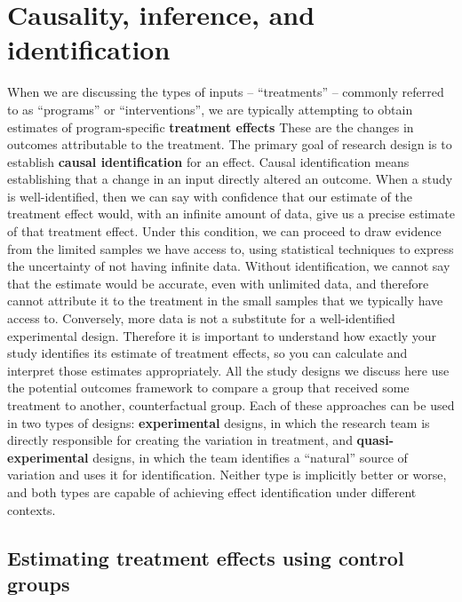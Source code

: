 \section{Causality, inference, and identification}

When we are discussing the types of inputs -- ``treatments'' -- commonly referred to as
``programs'' or ``interventions'', we are typically attempting to obtain estimates
of program-specific \textbf{treatment effects}
These are the changes in outcomes attributable to the treatment.\cite{abadie2018econometric}
The primary goal of research design is to establish \textbf{causal identification} for an effect.
Causal identification means establishing that a change in an input directly altered an outcome.
When a study is well-identified, then we can say with confidence
that our estimate of the treatment effect would,
with an infinite amount of data,
give us a precise estimate of that treatment effect.
Under this condition, we can proceed to draw evidence from the limited samples we have access to,
using statistical techniques to express the uncertainty of not having infinite data.
Without identification, we cannot say that the estimate would be accurate,
even with unlimited data, and therefore cannot attribute it to the treatment
in the small samples that we typically have access to.
Conversely, more data is not a substitute for a well-identified experimental design.
Therefore it is important to understand how exactly your study
identifies its estimate of treatment effects,
so you can calculate and interpret those estimates appropriately.
All the study designs we discuss here use the potential outcomes framework\cite{athey2017state}
to compare a group that received some treatment to another, counterfactual group.
Each of these approaches can be used in two types of designs:
\textbf{experimental} designs, in which the research team
is directly responsible for creating the variation in treatment,
and \textbf{quasi-experimental} designs, in which the team
identifies a ``natural'' source of variation and uses it for identification.
Neither type is implicitly better or worse,
and both types are capable of achieving effect identification under different contexts.

\subsection{Estimating treatment effects using control groups}

